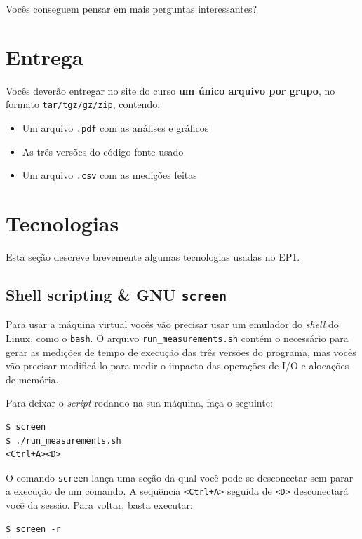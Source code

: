 \documentclass[final,12pt,a4paper]{elsarticle}
\begin{document}
Vocês conseguem pensar em mais perguntas interessantes?

\section{Entrega}

Vocês deverão entregar no site do  curso \textbf{um único arquivo por grupo}, no
formato \texttt{tar/tgz/gz/zip}, contendo:

\begin{itemize}
\item Um arquivo \texttt{.pdf} com as análises e gráficos
\item As três versões do código fonte usado
\item Um arquivo \texttt{.csv} com as medições feitas
\end{itemize}

\section{Tecnologias}

Esta seção descreve brevemente algumas  tecnologias usadas no EP1.

\subsection{Shell scripting \& GNU \texttt{screen}}

Para usar a máquina virtual vocês vão precisar usar um emulador do
\textit{shell} do Linux, como o \texttt{bash}.  O arquivo
\texttt{run\_measurements.sh} contém o necessário para gerar as medições de tempo
de execução das três versões do programa, mas vocês vão precisar modificá-lo
para medir o impacto das operações de I/O e alocações de memória.

Para deixar o \textit{script} rodando na sua máquina, faça o seguinte:

\begin{lstlisting}
$ screen
$ ./run_measurements.sh
<Ctrl+A><D>
\end{lstlisting}

O comando \texttt{screen} lança uma seção da qual você pode se desconectar sem
parar a execução de um comando. A sequência \texttt{<Ctrl+A>} seguida de
\texttt{<D>} desconectará você da sessão. Para voltar, basta executar:

\begin{lstlisting}
$ screen -r
\end{lstlisting}
\end{document}
